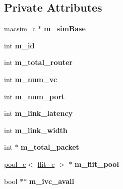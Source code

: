 \subsection*{Private Attributes}
\begin{DoxyCompactItemize}
\item 
\hypertarget{classrouter__c_acaaad5e0c0c603141a6f321fcdb89f33}{
\hyperlink{classmacsim__c}{macsim\_\-c} $\ast$ {\bfseries m\_\-simBase}}
\label{classrouter__c_acaaad5e0c0c603141a6f321fcdb89f33}

\item 
\hypertarget{classrouter__c_ae5470884793d2ab174da1c200008eb67}{
int {\bfseries m\_\-id}}
\label{classrouter__c_ae5470884793d2ab174da1c200008eb67}

\item 
\hypertarget{classrouter__c_a33492fc8ff4a650ded86bd8b57c30313}{
int {\bfseries m\_\-total\_\-router}}
\label{classrouter__c_a33492fc8ff4a650ded86bd8b57c30313}

\item 
\hypertarget{classrouter__c_a84a4873364e7ab0f115110b2510cd9aa}{
int {\bfseries m\_\-num\_\-vc}}
\label{classrouter__c_a84a4873364e7ab0f115110b2510cd9aa}

\item 
\hypertarget{classrouter__c_a849c6cb2b3f1a2fd8c56acc80d885e42}{
int {\bfseries m\_\-num\_\-port}}
\label{classrouter__c_a849c6cb2b3f1a2fd8c56acc80d885e42}

\item 
\hypertarget{classrouter__c_a217ba2f0d88260b12b6feb01912c2d7d}{
int {\bfseries m\_\-link\_\-latency}}
\label{classrouter__c_a217ba2f0d88260b12b6feb01912c2d7d}

\item 
\hypertarget{classrouter__c_af2f4fd7e4c456bb2d57b1d75ecad7b41}{
int {\bfseries m\_\-link\_\-width}}
\label{classrouter__c_af2f4fd7e4c456bb2d57b1d75ecad7b41}

\item 
\hypertarget{classrouter__c_a00bcc44359d37ce339f9b2294b41b488}{
int $\ast$ {\bfseries m\_\-total\_\-packet}}
\label{classrouter__c_a00bcc44359d37ce339f9b2294b41b488}

\item 
\hypertarget{classrouter__c_a165f1074452c77f5030de60c45708a58}{
\hyperlink{classpool__c}{pool\_\-c}$<$ \hyperlink{classflit__c}{flit\_\-c} $>$ $\ast$ {\bfseries m\_\-flit\_\-pool}}
\label{classrouter__c_a165f1074452c77f5030de60c45708a58}

\item 
\hypertarget{classrouter__c_a7a8336a11b7e3b34a1d7fd3fa3227eb0}{
bool $\ast$$\ast$ {\bfseries m\_\-ivc\_\-avail}}
\label{classrouter__c_a7a8336a11b7e3b34a1d7fd3fa3227eb0}


\end{DoxyCompactItemize}

